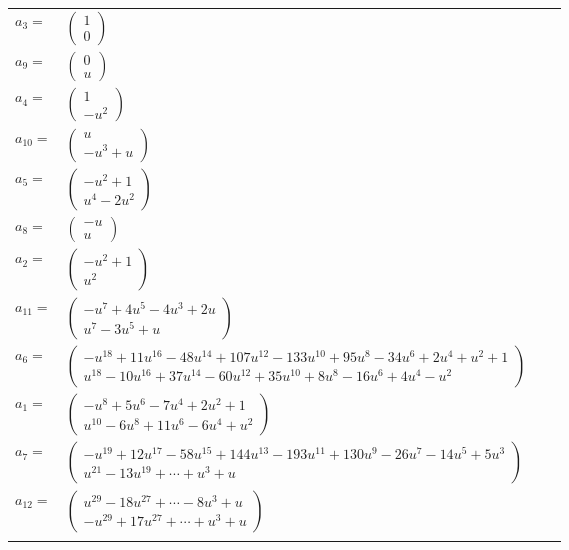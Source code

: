 \documentclass[1p]{elsarticle_modified}
\theoremstyle{definition}
\begin{document}
\begin{tabular}{m{7pt} m{180pt} m{7pt} m{180pt} }
\flushright $a_{3}=$&$\begin{pmatrix}1\\0\end{pmatrix}$ \\
\flushright $a_{9}=$&$\begin{pmatrix}0\\u\end{pmatrix}$ \\
\flushright $a_{4}=$&$\begin{pmatrix}1\\- u^2\end{pmatrix}$ \\
\flushright $a_{10}=$&$\begin{pmatrix}u\\- u^3+u\end{pmatrix}$ \\
\flushright $a_{5}=$&$\begin{pmatrix}- u^2+1\\u^4-2 u^2\end{pmatrix}$ \\
\flushright $a_{8}=$&$\begin{pmatrix}- u\\u\end{pmatrix}$ \\
\flushright $a_{2}=$&$\begin{pmatrix}- u^2+1\\u^2\end{pmatrix}$ \\
\flushright $a_{11}=$&$\begin{pmatrix}- u^7+4 u^5-4 u^3+2 u\\u^7-3 u^5+u\end{pmatrix}$ \\
\flushright $a_{6}=$&$\begin{pmatrix}- u^{18}+11 u^{16}-48 u^{14}+107 u^{12}-133 u^{10}+95 u^8-34 u^6+2 u^4+u^2+1\\u^{18}-10 u^{16}+37 u^{14}-60 u^{12}+35 u^{10}+8 u^8-16 u^6+4 u^4- u^2\end{pmatrix}$ \\
\flushright $a_{1}=$&$\begin{pmatrix}- u^8+5 u^6-7 u^4+2 u^2+1\\u^{10}-6 u^8+11 u^6-6 u^4+u^2\end{pmatrix}$ \\
\flushright $a_{7}=$&$\begin{pmatrix}- u^{19}+12 u^{17}-58 u^{15}+144 u^{13}-193 u^{11}+130 u^9-26 u^7-14 u^5+5 u^3\\u^{21}-13 u^{19}+\cdots+u^3+u\end{pmatrix}$ \\
\flushright $a_{12}=$&$\begin{pmatrix}u^{29}-18 u^{27}+\cdots-8 u^3+u\\- u^{29}+17 u^{27}+\cdots+u^3+u\end{pmatrix}$\\&\end{tabular}
\end{document}
